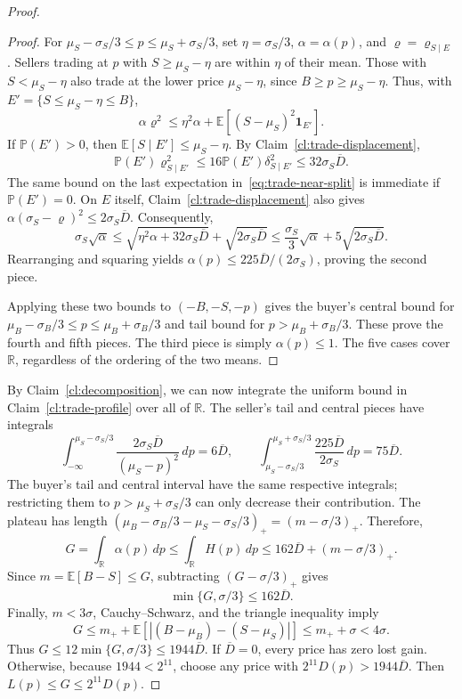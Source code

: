 \documentclass[11pt]{article}
\newcommand{\E}[1]{\mathbb E\left[#1\right]}
\newcommand{\R}{\mathbb R}
\begin{document}
\begin{proof}
\begin{proof}
For $\mu_S-\sigma_S/3\le p\le\mu_S+\sigma_S/3$, set $\eta=\sigma_S/3$, $\alpha=\alpha(p)$, and $\varrho=\varrho_{S\mid E}$. Sellers trading at $p$ with $S\ge\mu_S-\eta$ are within $\eta$ of their mean. Those with $S<\mu_S-\eta$ also trade at the lower price $\mu_S-\eta$, since $B\ge p\ge\mu_S-\eta$. Thus, with $E'=\{S\le\mu_S-\eta\le B\}$,
\begin{equation}\label{eq:trade-near-split}
 \alpha\varrho^2
 \le\eta^2\alpha+\E{(S-\mu_S)^2\mathbf1_{E'}}.
\end{equation}
If $\mathbb P(E')>0$, then $\E{S\mid E'}\le\mu_S-\eta$. By Claim~\ref{cl:trade-displacement},
\[
 \mathbb P(E')\varrho_{S\mid E'}^2
 \le16\mathbb P(E')\delta_{S\mid E'}^2
 \le32\sigma_S\overline D.
\]
The same bound on the last expectation in~\eqref{eq:trade-near-split} is immediate if $\mathbb P(E')=0$. On $E$ itself, Claim~\ref{cl:trade-displacement} also gives
$\alpha(\sigma_S-\varrho)^2\le2\sigma_S\overline D$. Consequently,
\[
 \sigma_S\sqrt\alpha
 \le\sqrt{\eta^2\alpha+32\sigma_S\overline D}
       +\sqrt{2\sigma_S\overline D}
 \le\frac{\sigma_S}{3}\sqrt\alpha
       +5\sqrt{2\sigma_S\overline D}.
\]
Rearranging and squaring yields
$\alpha(p)\le225\overline D/(2\sigma_S)$, proving the second piece.

Applying these two bounds to $(-B,-S,-p)$ gives the buyer's central bound for $\mu_B-\sigma_B/3\le p\le\mu_B+\sigma_B/3$ and tail bound for $p>\mu_B+\sigma_B/3$. These prove the fourth and fifth pieces. The third piece is simply $\alpha(p)\le1$. The five cases cover $\R$, regardless of the ordering of the two means.
\end{proof}

By Claim~\ref{cl:decomposition}, we can now integrate the uniform bound in Claim~\ref{cl:trade-profile} over all of $\R$. The seller's tail and central pieces have integrals
\[
 \int_{-\infty}^{\mu_S-\sigma_S/3}
     \frac{2\sigma_S\overline D}{(\mu_S-p)^2}\,dp
 =6\overline D,
 \qquad
 \int_{\mu_S-\sigma_S/3}^{\mu_S+\sigma_S/3}
     \frac{225\overline D}{2\sigma_S}\,dp
 =75\overline D.
\]
The buyer's tail and central interval have the same respective integrals; restricting them to $p>\mu_S+\sigma_S/3$ can only decrease their contribution. The plateau has length $(\mu_B-\sigma_B/3-\mu_S-\sigma_S/3)_+=(m-\sigma/3)_+$. Therefore,
\begin{equation}\label{eq:trade-area}
 G=\int_{\R}\alpha(p)\,dp
 \le\int_{\R}H(p)\,dp
 \le162\overline D+(m-\sigma/3)_+.
\end{equation}
Since $m=\E{B-S}\le G$, subtracting $(G-\sigma/3)_+$ gives
\begin{equation}\label{eq:trade-small-gain}
 \min\{G,\sigma/3\}\le162\overline D.
\end{equation}
Finally, $m<3\sigma$, Cauchy--Schwarz, and the triangle inequality imply
\[
 G\le m_++\E{|(B-\mu_B)-(S-\mu_S)|}
 \le m_++\sigma<4\sigma.
\]
Thus $G\le12\min\{G,\sigma/3\}\le1944\overline D$. If $\overline D=0$, every price has zero lost gain. Otherwise, because $1944<2^{11}$, choose any price with $2^{11}D(p)>1944\overline D$. Then $L(p)\le G\le2^{11}D(p)$.
\end{proof}
\end{document}
